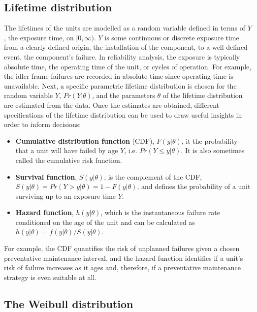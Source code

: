 \subsection{Lifetime distribution}

The lifetimes of the units are modelled as a random variable defined in terms of $Y$, the exposure time, on $[0, \infty)$. $Y$ is some continuous or discrete exposure time from a clearly defined origin, the installation of the component, to a well-defined event, the component's failure. In reliability analysis, the exposure is typically absolute time, the operating time of the unit, or cycles of operation. For example, the idler-frame failures are recorded in absolute time since operating time is unavailable. Next, a specific parametric lifetime distribution is chosen for the random variable $Y$, $Pr(Y|\theta)$, and the parameters $\theta$ of the lifetime distribution are estimated from the data. Once the estimates are obtained, different specifications of the lifetime distribution can be used to draw useful insights in order to inform decisions:
\begin{itemize}
    \item \textbf{Cumulative distribution function} (CDF), $F(y|\theta)$, it the probability that a unit will have failed by age $Y$, i.e. $Pr(Y \le y|\theta)$. It is also sometimes called the cumulative risk function.
    \item \textbf{Survival function}, $S(y|\theta)$, is the complement of the CDF, $S(y|\theta) = Pr(Y > y|\theta) = 1 - F(y|\theta)$, and defines the probability of a unit surviving up to an exposure time $Y$.
    \item \textbf{Hazard function}, $h(y|\theta)$, which is the instantaneous failure rate conditioned on the age of the unit and can be calculated as $h(y|\theta) = f(y|\theta) / S(y|\theta)$.
\end{itemize}
For example, the CDF quantifies the risk of unplanned failures given a chosen preventative maintenance interval, and the hazard function identifies if a unit's risk of failure increases as it ages and, therefore, if a preventative maintenance strategy is even suitable at all.

\subsection{The Weibull distribution} \label{subsec:weibull-dist}

